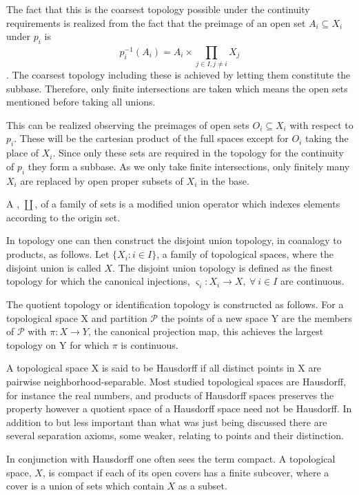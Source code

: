 \documentclass[../../main.tex]{subfiles}
\begin{document}
    The fact that this is the coarsest topology possible under the continuity requirements is realized from the fact that the preimage of an open set $A_i \subseteq X_i$ under $p_i$ is $$p_i^{-1}(A_i) = A_i \times \prod_{j \in I, j \ne i}^{}X_j$$. The coarsest topology including these is achieved by letting them constitute the subbase. Therefore, only finite intersections are taken which means the open sets mentioned before taking all unions.
    
    This can be realized observing the preimages of open sets $O_i \subseteq X_i$ with respect to $p_i$. These will be the cartesian product of the full spaces except for $O_i$ taking the place of $X_i$. Since only these sets are required in the topology for the continuity of $p_i$ they form a subbase. As we only take finite intersections, only finitely many $X_i$ are replaced by open proper subsets of $X_i$ in the base.
    
    \begin{definition}
        A , $\coprod$, of a family of sets is a modified union operator which indexes elements according to the origin set. 
    \end{definition}
    
    In topology one can then construct the disjoint union topology, in coanalogy to products, as follows. Let $\{X_i : i \in I\}$, a family of topological spaces, where the disjoint union is called $X$. The disjoint union topology is defined as the finest topology for which the canonical injections, $\varsigma_i :X_i\to X, \: \forall\: i \in I$ are continuous.
    
    The quotient topology or identification topology is constructed as follows. For a topological space X and partition $\mathcal{P}$ the points of a new space Y are the members of $\mathcal{P}$ with $\pi:X\to Y$, the canonical projection map, this achieves the largest topology on Y for which $\pi$ is continuous.
    
    A topological space X is said to be Hausdorff if all distinct points in X are pairwise neighborhood-separable. Most studied topological spaces are Hausdorff, for instance the real numbers, and products of Hausdorff spaces preserves the property however a quotient space of a Hausdorff space need not be Hausdorff. In addition to but less important than what was just being discussed there are several separation axioms, some weaker, relating to points and their distinction. 
    
    In conjunction with Hausdorff one often sees the term compact. A topological space, $X$, is compact if each of its open covers has a finite subcover, where a cover is a union of sets which contain $X$ as a subset. 
    
\end{document}
